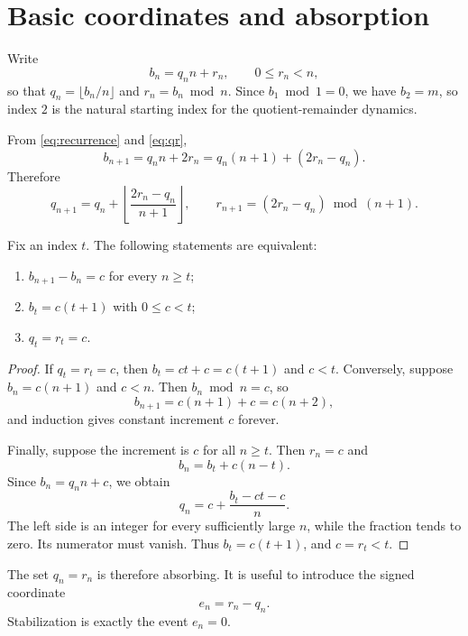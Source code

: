 \section{Basic coordinates and absorption}

Write
\begin{equation}
 b_n=q_n n+r_n,
 \qquad 0\le r_n<n,
 \label{eq:qr}
\end{equation}
so that $q_n=\lfloor b_n/n\rfloor$ and $r_n=b_n\bmod n$. Since $b_1\bmod1=0$, we have $b_2=m$, so index $2$ is the natural starting index for the quotient-remainder dynamics.

From \eqref{eq:recurrence} and \eqref{eq:qr},
\[
 b_{n+1}=q_n n+2r_n
          =q_n(n+1)+(2r_n-q_n).
\]
Therefore
\begin{equation}
 q_{n+1}=q_n+\left\lfloor\frac{2r_n-q_n}{n+1}\right\rfloor,
 \qquad
 r_{n+1}=(2r_n-q_n)\bmod(n+1).
 \label{eq:transition}
\end{equation}

\begin{theorem}
Fix an index $t$. The following statements are equivalent:
\begin{enumerate}[label=(\roman*)]
\item $b_{n+1}-b_n=c$ for every $n\ge t$;
\item $b_t=c(t+1)$ with $0\le c<t$;
\item $q_t=r_t=c$.
\end{enumerate}
\end{theorem}

\begin{proof}
If $q_t=r_t=c$, then $b_t=ct+c=c(t+1)$ and $c<t$. Conversely, suppose $b_n=c(n+1)$ and $c<n$. Then $b_n\bmod n=c$, so
\[
 b_{n+1}=c(n+1)+c=c(n+2),
\]
and induction gives constant increment $c$ forever.

Finally, suppose the increment is $c$ for all $n\ge t$. Then $r_n=c$ and
\[
 b_n=b_t+c(n-t).
\]
Since $b_n=q_n n+c$, we obtain
\[
 q_n=c+\frac{b_t-ct-c}{n}.
\]
The left side is an integer for every sufficiently large $n$, while the fraction tends to zero. Its numerator must vanish. Thus $b_t=c(t+1)$, and $c=r_t<t$.
\end{proof}

The set $q_n=r_n$ is therefore absorbing. It is useful to introduce the signed coordinate
\begin{equation}
 e_n=r_n-q_n.
 \label{eq:e}
\end{equation}
Stabilization is exactly the event $e_n=0$.
